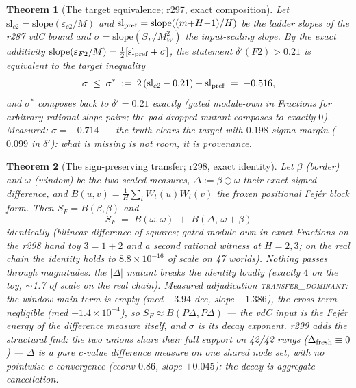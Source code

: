 \documentclass[11pt]{article}
\newtheorem{theorem}{Theorem}[section]
\theoremstyle{definition}
\theoremstyle{remark}
\begin{document}
\begin{theorem}[The target equivalence; r297, exact composition]
\label{thm:sigmastar}
Let $\mathrm{sl}_{c2} = \mathrm{slope}(\varepsilon_{c2}/M)$ and
$\mathrm{sl}_{\rm pref} = \mathrm{slope}((m{+}H{-}1)/H)$ be the ladder
slopes of the r287 vdC bound and $\sigma =
\mathrm{slope}(S_F/M_W^2)$ the input-scaling slope.  By the exact
additivity $\mathrm{slope}(\varepsilon_{F2}/M) =
\tfrac12[\mathrm{sl}_{\rm pref} + \sigma]$, the statement
$\delta'(F2) > 0.21$ is \emph{equivalent} to the target inequality
\[
\sigma \;\le\; \sigma^* \;:=\; 2\,(\mathrm{sl}_{c2} - 0.21)
- \mathrm{sl}_{\rm pref} \;=\; -0.516,
\]
and $\sigma^*$ composes back to $\delta' = 0.21$ \emph{exactly}
(gated module-own in Fractions for arbitrary rational slope pairs;
the pad-dropped mutant composes to exactly $0$).  Measured: $\sigma =
-0.714$ --- the truth clears the target with $0.198$ sigma margin
($0.099$ in $\delta'$): \emph{what is missing is not room, it is
provenance}.
\end{theorem}

\begin{theorem}[The sign-preserving transfer; r298, exact identity]
\label{thm:transfer}
Let $\beta$ (border) and $\omega$ (window) be the two sealed measures,
$\Delta := \beta \ominus \omega$ their exact signed difference, and
$B(u,v) = \tfrac1H\sum_t W_t(u)W_t(v)$ the frozen positional Fej\'er
block form.  Then $S_F = B(\beta,\beta)$ and
\[
S_F \;=\; B(\omega,\omega) \;+\; B(\Delta,\, \omega + \beta)
\]
\emph{identically} (bilinear difference-of-squares; gated module-own
in exact Fractions on the r298 hand toy $3 = 1 + 2$ and a second
rational witness at $H = 2, 3$; on the real chain the identity holds
to $8.8\times10^{-16}$ of scale on 47 worlds).  Nothing passes through
magnitudes: the $|\Delta|$ mutant breaks the identity loudly (exactly
$4$ on the toy, $\sim$1.7 of scale on the real chain).  Measured
adjudication \textsc{transfer\_dominant}: the window main term is
\emph{empty} (med $-3.94$ dec, slope $-1.386$), the cross term
negligible (med $-1.4\times10^{-4}$), so $S_F \approx B(P\Delta,
P\Delta)$ --- \emph{the vdC input is the Fej\'er energy of the
difference measure itself}, and $\sigma$ is its decay exponent.
r299 adds the structural find: the two unions share their full
support on 42/42 rungs ($\Delta_{\rm fresh} \equiv 0$) --- $\Delta$
is a pure c-value difference measure on one shared node set, with no
pointwise c-convergence (cconv $0.86$, slope $+0.045$): the decay is
aggregate cancellation.
\end{theorem}
\end{document}
